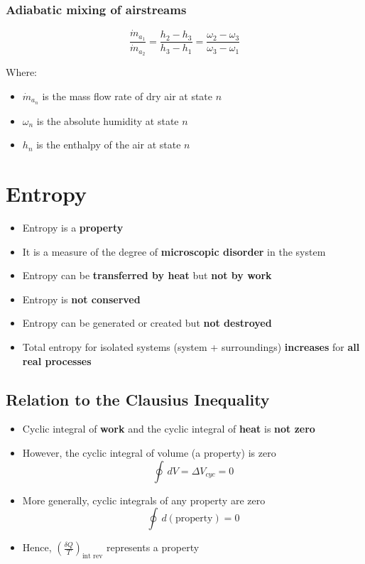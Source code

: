 \documentclass[11pt]{article}
\begin{document}
\subsubsection{Adiabatic mixing of airstreams}
\label{sec:orga50fa9b}
\[\frac{\dot{m}_{a_1}}{\dot{m}_{a_2}} = \frac{h_2 - h_3}{h_3 - h_1} = \frac{\omega_2 - \omega_3}{\omega_3 - \omega_1}\]

Where:
\begin{itemize}
\item \(\dot{m}_{a_n}\) is the mass flow rate of dry air at state \(n\)
\item \(\omega_n\) is the absolute humidity at state \(n\)
\item \(h_n\) is the enthalpy of the air at state \(n\)
\end{itemize}

 \newpage

\section{Entropy}
\label{sec:org84ece7f}
\begin{itemize}
\item Entropy is a \textbf{property}
\item It is a measure of the degree of \textbf{microscopic disorder} in the system
\item Entropy can be \textbf{transferred by heat} but \textbf{not by work}
\item Entropy is \textbf{not conserved}
\item Entropy can be generated or created but \textbf{not destroyed}
\item Total entropy for isolated systems (system + surroundings) \textbf{increases} for \textbf{all real processes}
\end{itemize}

\subsection{Relation to the Clausius Inequality}
\label{sec:orgebd7ca9}
\begin{itemize}
\item Cyclic integral of \textbf{work} and the cyclic integral of \textbf{heat} is \textbf{not zero}
\item However, the cyclic integral of volume (a property) is zero
\[\oint \, dV = \Delta V_{cyc} = 0\]
\item More generally, cyclic integrals of any property are zero
\[\oint \, d(\text{property}) = 0\]
\item Hence, \(\left(\frac{\delta Q}{T} \right)_{\text{int rev}}\) represents a property
\end{itemize}
\end{document}
